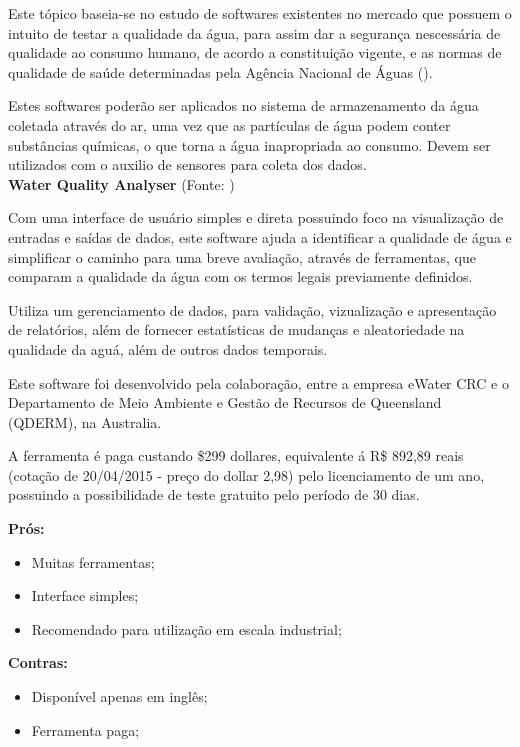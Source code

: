 	Este tópico baseia-se no estudo de softwares existentes no mercado que possuem o intuito de testar a qualidade da água,
	para assim dar a segurança nescessária de qualidade ao consumo humano, de acordo a constituição vigente, e as normas
	de qualidade de saúde determinadas pela Agência Nacional de Águas (\citeauthor{anaGov}).
	
	Estes softwares poderão ser aplicados no sistema de armazenamento da água coletada através do ar, uma vez que as
	partículas de água podem conter substâncias químicas, o que torna a água inapropriada ao consumo. Devem ser utilizados
	com o auxilio de sensores para coleta dos dados. \\

\noindent
\textbf{Water Quality Analyser} (Fonte: \citeauthor{eWater})

	Com uma interface de usuário simples e direta possuindo foco na visualização de entradas e saídas de dados, este
	software ajuda a identificar a qualidade de água e simplificar o caminho para uma breve avaliação, através de
	ferramentas, que comparam a qualidade da água com os termos legais previamente definidos.
	
	Utiliza um gerenciamento de dados, para validação, vizualização e apresentação de relatórios, além de fornecer
	estatísticas de mudanças e aleatoriedade na qualidade da aguá, além de outros dados temporais.
	
	Este software foi desenvolvido pela colaboração, entre a empresa eWater CRC e o Departamento de Meio Ambiente
	e Gestão de Recursos de Queensland (QDERM), na Australia.
	
	A ferramenta é paga custando \$299 dollares, equivalente á R\$ 892,89 reais (cotação de 20/04/2015 - preço do
	dollar 2,98) pelo licenciamento de um ano, possuindo a possibilidade de teste gratuito pelo período de 30 dias.

	
\textbf{Prós:}
	
\begin{itemize}
  \item Muitas ferramentas;
  \item Interface simples;
  \item Recomendado para utilização em escala industrial;
 \end{itemize}
 
\textbf{Contras:}
	
\begin{itemize}
  \item Disponível apenas em inglês;
  \item Ferramenta paga;\\
 \end{itemize}

